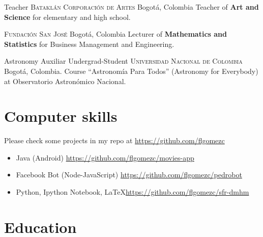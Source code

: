 \documentclass[12pt,letterpaper,sans]{moderncv}
\begin{document}
        {Teacher}
        {\textsc{Batakl\'an Corporaci\'on de Artes}}
        {Bogot\'a, Colombia}{}
        {Teacher of \textbf{Art and Science} for elementary and high school.}

        {\textsc{Fundaci\'on San Jos\'e}}
        {Bogot\'a, Colombia}{}
        {Lecturer of \textbf{Mathematics and Statistics} for Business Management and Engineering.}


{Astronomy Auxiliar Undergrad-Student}
{\textsc{Universidad Nacional de Colombia}}
{Bogot\'a, Colombia.}{}
{Course ``Astronom\'ia Para Todos'' (Astronomy for Everybody) at Observatorio 
Astron\'omico Nacional.}


\section{Computer skills}

Please check some projects in my repo at \url{https://github.com/flgomezc}
\medskip

\begin{itemize}
\item Java (Android) \url{https://github.com/flgomezc/movies-app}
\item Facebook Bot (Node-JavaScript) \url{https://github.com/flgomezc/pedrobot}
\item Python, Ipython Notebook, \LaTeX \url{https://github.com/flgomezc/sfr-dmhm}
\end{itemize}

\medskip




\section{Education}
\end{document}
